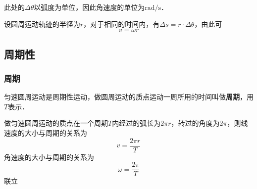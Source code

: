此处的$\Delta \theta$以弧度为单位，因此角速度的单位为$\mathrm{rad/s}$．

设圆周运动轨迹的半径为$r$，对于相同的时间内，有$\Delta s=r \cdot \Delta \theta$，由此可
\begin{equation}
v=\omega r
\end{equation}

\subsection{周期性}

\subsubsection{周期}

匀速圆周运动是周期性运动，做圆周运动的质点运动一周所用的时间叫做\textbf{周期}，用$T$表示．

做匀速圆周运动的质点在一个周期$T$内经过的弧长为$2\pi r$，转过的角度为$2\pi$，则线速度的大小与周期的关系为
\begin{equation}
v=\frac{2\pi r}{T}
\end{equation}
角速度的大小与周期的关系为
\begin{equation}
\omega = \frac{2\pi}{T}
\end{equation}
联立
